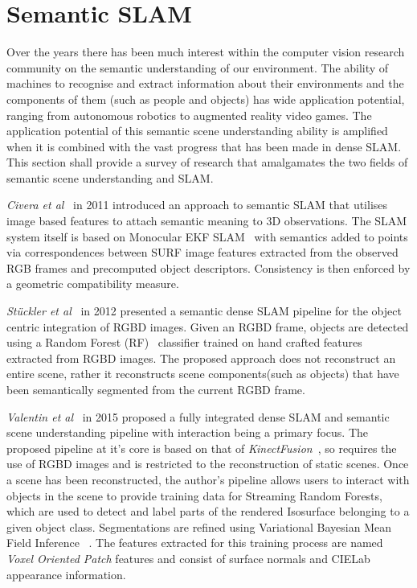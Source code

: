 \section{Semantic SLAM}
Over the years there has been much interest within the computer vision research community on 
the semantic understanding of our environment. The ability of machines to recognise and extract 
information about their environments and the components of them (such as people and objects) has 
wide application potential, ranging from autonomous robotics to augmented reality video games. 
The application potential of this semantic scene understanding ability is amplified when it is 
combined with the vast progress that has been made in dense SLAM. This section shall provide a 
survey of research that amalgamates the two fields of semantic scene understanding and SLAM.


\label{sec:lit_review_semantic}
\textit{Civera et al}~\cite{Civera2011} in 2011 introduced an approach to semantic SLAM 
that utilises image based features to attach semantic meaning to 3D observations. The SLAM 
system itself is based on Monocular EKF SLAM~\cite{Smith1990} with semantics added to points via 
correspondences between SURF\cite{Bay2006} image features extracted from the observed RGB frames and 
precomputed object descriptors. Consistency is then enforced by a geometric compatibility 
measure.

\textit{St{\"u}ckler et al}~\cite{Stuckler2012} in 2012 presented a semantic dense SLAM 
pipeline for the object centric integration of RGBD images. Given an RGBD frame, objects 
are detected using a Random Forest (RF)~\cite{Ho1995} classifier trained on hand crafted features 
extracted from RGBD images. The proposed approach does not reconstruct an entire scene, rather it 
reconstructs scene components(such as objects) that have been semantically segmented 
from the current RGBD frame.

\textit{Valentin et al}~\cite{Valentin2015} in 2015 proposed a fully integrated dense SLAM 
and semantic scene understanding pipeline with interaction being a primary focus. The 
proposed pipeline at it's core is based on that of \textit{KinectFusion}~\cite{Newcombe2011}, 
so requires the use of RGBD images and is restricted to the reconstruction of static scenes. 
Once a scene has been reconstructed, the author's pipeline allows users to interact with 
objects in the scene to provide training data for Streaming Random Forests\cite{Abdulsalam2007}, 
which are used to detect and label parts of the rendered Isosurface belonging to a given 
object class. Segmentations are refined using Variational Bayesian Mean Field Inference 
~\cite{Xing2002, Krahenbuhl2011}. The features extracted for this training 
process are named \textit{Voxel Oriented Patch} features and consist of surface normals 
and CIELab appearance information.

